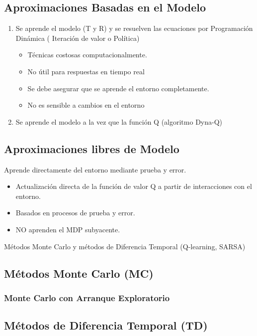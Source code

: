 \documentclass[12pt]{report} %
\begin{document}
\newpage

\subsection{Aproximaciones Basadas en el Modelo}
\begin{enumerate}
  \item Se aprende el modelo (T y R) y se resuelven las ecuaciones por Programación Dinámica ( Iteración de valor o Política)
  \begin{itemize}
    \item Técnicas costosas computacionalmente.
    \item No útil para respuestas en tiempo real
    \item Se debe asegurar que se aprende el entorno completamente.
    \item No es sensible a cambios en el entorno 
  \end{itemize}
  \item Se aprende el modelo a la vez que la función Q (algoritmo Dyna-Q)
\end{enumerate}

\subsection{Aproximaciones libres de Modelo}
Aprende directamente del entorno mediante prueba y error.
\begin{itemize}
  \item Actualización directa de la función de valor Q a partir de interacciones con el entorno.
  \item Basados en procesos de prueba y error.
  \item NO aprenden el MDP subyacente.
\end{itemize}
Métodos Monte Carlo y métodos de Diferencia Temporal (Q-learning, SARSA)

\subsection{Métodos Monte Carlo (MC)}
\subsubsection{Monte Carlo con Arranque Exploratorio}

\subsection{Métodos de Diferencia Temporal (TD)}
\end{document}
